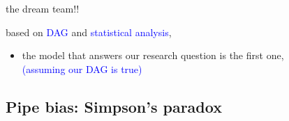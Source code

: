 %
%
\begin{lhframe}[rhgraphic={\texttt{[image: pipe2\_reg1.png]}}]
	{the dream team!!}
	
	based on \textcolor{blue}{DAG} and \textcolor{blue}{statistical analysis},
	\begin{itemize}
		\item the model that answers our research question is the first one, \\
		{\small \textcolor{blue}{(assuming our DAG is true)} }
	\end{itemize}
\end{lhframe}
%
%
\subsection{Pipe bias: Simpson's paradox}
%
%
\begin{frame}[t, negative]
	\subsectionpage
\end{frame}
%
%
